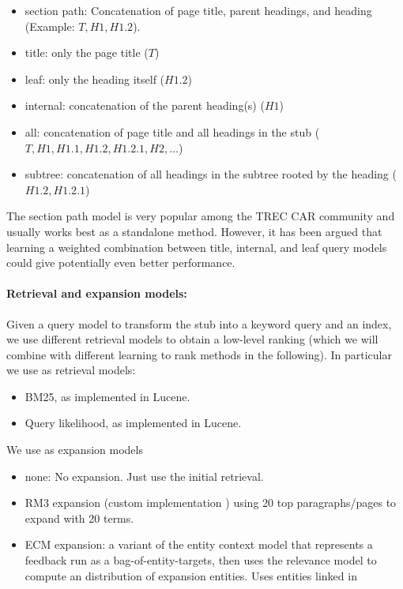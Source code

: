 \documentclass{article}
\begin{document}
\begin{itemize}
    \item section path: Concatenation of page title, parent headings, and heading (Example: $T,H1,H1.2$).
    \item title: only the page title ($T$)
    \item leaf: only the heading itself ($H1.2$)
    \item internal: concatenation of the parent heading(s) ($H1$)
    \item all: concatenation of page title and all headings in the stub ($T,H1,H1.1,H1.2, H1.2.1,H2,\dots$)
    \item subtree: concatenation of all headings in the subtree rooted by the heading ($H1.2, H1.2.1$)
\end{itemize}

The section path model is very popular among the TREC CAR community and usually works best as a standalone method. However, it has been argued that learning a weighted combination between title, internal, and leaf query models could give potentially even better performance.


\paragraph{Retrieval and expansion models:}

Given a query model to transform the stub into a keyword query and an index, we  use different retrieval models to obtain a low-level ranking (which we will combine with different learning to rank methods in the following). In particular we use as retrieval models:

\begin{itemize}
    \item BM25, as implemented in Lucene.
    \item Query likelihood, as implemented in Lucene.
\end{itemize}

We use as expansion models    
\begin{itemize}
    \item none: No expansion. Just use the initial retrieval.
    \item RM3 expansion (custom implementation \cite{lavrenko2017relevance}) using 20 top paragraphs/pages to expand with 20 terms.
    \item ECM expansion: a variant of the entity context model \cite{dalton2014entity} that represents a feedback run as a bag-of-entity-targets, then uses the relevance model to compute an distribution of expansion entities.  Uses entities linked in 
\end{itemize}
\end{document}
